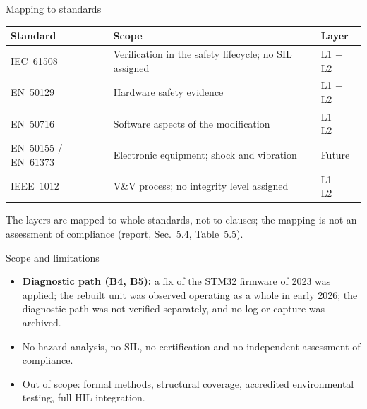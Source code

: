 \begin{frame}{Mapping to standards}
  \centering\small
  \begin{tabular}{@{}lll@{}}
    \toprule
    \textbf{Standard} & \textbf{Scope} & \textbf{Layer} \\
    \midrule
    IEC~61508 & Verification in the safety lifecycle; no SIL assigned & L1 + L2 \\
    EN~50129  & Hardware safety evidence & L1 + L2 \\
    EN~50716  & Software aspects of the modification & L1 + L2 \\
    EN~50155 / EN~61373 & Electronic equipment; shock and vibration & Future \\
    IEEE~1012 & V\&V process; no integrity level assigned & L1 + L2 \\
    \bottomrule
  \end{tabular}
  \vfill
  \footnotesize The layers are mapped to whole standards, not to clauses; the mapping is not an assessment of compliance (report, Sec.~5.4, Table~5.5).
\end{frame}

\begin{frame}{Scope and limitations}
  \begin{itemize}
    \item \textbf{Diagnostic path (B4, B5):} a fix of the STM32 firmware of 2023 was applied; the rebuilt unit was observed operating as a whole in early 2026; the diagnostic path was not verified separately, and no log or capture was archived.
    \item No hazard analysis, no SIL, no certification and no independent assessment of compliance.
    \item Out of scope: formal methods, structural coverage, accredited environmental testing, full HIL integration.
  \end{itemize}
\end{frame}

